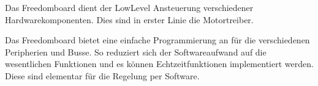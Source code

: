 Das Freedomboard dient der LowLevel Ansteuerung verschiedener
Hardwarekomponenten. Dies sind in erster Linie die Motortreiber.

Das Freedomboard bietet eine einfache Programmierung an für die
verschiedenen Peripherien und Busse. So reduziert sich der Softwareaufwand auf
die wesentlichen Funktionen und es können Echtzeitfunktionen
implementiert werden. Diese sind elementar für die Regelung
per Software.
